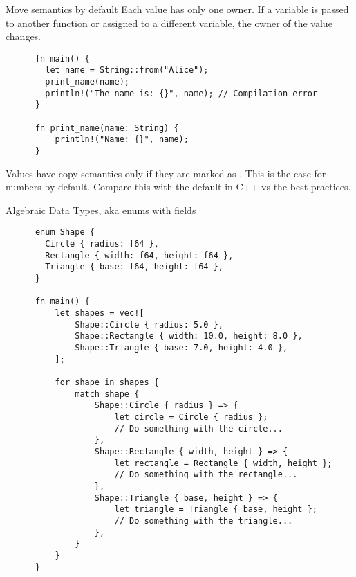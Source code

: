 \documentclass{beamer}
\begin{document}
\begin{frame}[fragile]{Move semantics by default}
  Each value has only one owner.
  If a variable is passed to another function or assigned to a different variable, the owner of the value changes.

  \vfill

  \begin{listing}
    \begin{verbatim}
      fn main() {
        let name = String::from("Alice");
        print_name(name);
        println!("The name is: {}", name); // Compilation error
      }
    
      fn print_name(name: String) {
          println!("Name: {}", name);
      }
    \end{verbatim}
  \end{listing}

  \vfill

  Values have copy semantics only if they are marked as .
  This is the case for numbers by default. Compare this with the default in C++ vs the best practices.
\end{frame}

\begin{frame}[fragile]{Algebraic Data Types, aka enums with fields}
  \begin{listing}
    \begin{verbatim}
      enum Shape {
        Circle { radius: f64 },
        Rectangle { width: f64, height: f64 },
        Triangle { base: f64, height: f64 },
      }
    
      fn main() {
          let shapes = vec![
              Shape::Circle { radius: 5.0 },
              Shape::Rectangle { width: 10.0, height: 8.0 },
              Shape::Triangle { base: 7.0, height: 4.0 },
          ];
      
          for shape in shapes {
              match shape {
                  Shape::Circle { radius } => {
                      let circle = Circle { radius };
                      // Do something with the circle...
                  },
                  Shape::Rectangle { width, height } => {
                      let rectangle = Rectangle { width, height };
                      // Do something with the rectangle...
                  },
                  Shape::Triangle { base, height } => {
                      let triangle = Triangle { base, height };
                      // Do something with the triangle...
                  },
              }
          }
      }
    \end{verbatim}
  \end{listing}
\end{frame}
\end{document}
